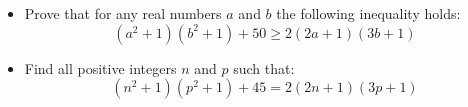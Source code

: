 
\begin{itemize}
	\item Prove that for any real numbers $a$ and $b$ the following inequality
holds:
\[ \left(  a^{2}+1\right)  \left(  b^{2}+1\right)  +50\geq2\left(  2a+1\right)\left(  3b+1\right)\]
	\item Find all positive integers $n$ and $p$ such that:
\[ \left(  n^{2}+1\right)  \left(  p^{2}+1\right)  +45=2\left(  2n+1\right)\left(  3p+1\right) \]
\end{itemize}
